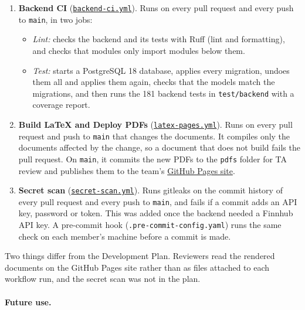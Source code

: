 \documentclass{article}
\begin{document}
\begin{enumerate}
\item \textbf{Backend CI}
  (\href{https://github.com/davislenover/BurnNEarn/blob/main/.github/workflows/backend-ci.yml}{\texttt{backend-ci.yml}}).
  Runs on every pull request and every push to \texttt{main}, in two jobs:
  \begin{itemize}
  \item \textit{Lint:} checks the backend and its tests with Ruff (lint and
    formatting), and checks that modules only import modules below them.
  \item \textit{Test:} starts a PostgreSQL 18 database, applies every
    migration, undoes them all and applies them again, checks that the models
    match the migrations, and then runs the 181 backend tests in
    \texttt{test/backend} with a coverage report.
  \end{itemize}
\item \textbf{Build LaTeX and Deploy PDFs}
  (\href{https://github.com/davislenover/BurnNEarn/blob/main/.github/workflows/latex-pages.yml}{\texttt{latex-pages.yml}}).
  Runs on every pull request and push to \texttt{main} that changes the
  documents. It compiles only the documents affected by the change, so a
  document that does not build fails the pull request. On \texttt{main}, it
  commits the new PDFs to the \texttt{pdfs} folder for TA review and publishes
  them to the team's
  \href{https://davislenover.github.io/BurnNEarn/}{GitHub Pages site}.
\item \textbf{Secret scan}
  (\href{https://github.com/davislenover/BurnNEarn/blob/main/.github/workflows/secret-scan.yml}{\texttt{secret-scan.yml}}).
  Runs gitleaks on the commit history of every pull request and every push to
  \texttt{main}, and fails if a commit adds an API key, password or token.
  This was added once the backend needed a Finnhub API key. A pre-commit hook
  (\texttt{.pre-commit-config.yaml}) runs the same check on each member's
  machine before a commit is made.
\end{enumerate}

Two things differ from the Development Plan. Reviewers read the rendered
documents on the GitHub Pages site rather than as files attached to each
workflow run, and the secret scan was not in the plan.

\paragraph{Future use.}
\end{document}
